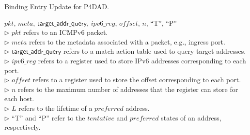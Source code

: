 \documentclass[journal]{IEEEtran}
\begin{document}
        \begin{algorithm}[!t]
        \caption{Binding Entry Update for P4DAD.}
        \label{alg:binding-entry-update}
            \begin{algorithmic}[1]
            \Require $pkt$, $meta$, $\mathsf{target\_addr\_query}$, $ipv6\_reg$, $of\!fset$, $n$, ``T'', ``P''\\
            $\triangleright$ $pkt$ refers to an ICMPv6 packet.\\
            $\triangleright$ $meta$ refers to the metadata associated with a packet, e.g., ingress port.\\
            $\triangleright$ $\mathsf{target\_addr\_query}$ refers to a match-action table used to query target addresses.\\
            $\triangleright$ $ipv6\_reg$ refers to a register used to store IPv6 addresses corresponding to each port.\\
            $\triangleright$ $of\!fset$ refers to a register used to store the offset corresponding to each port.\\
            $\triangleright$ $n$ refers to the maximum number of addresses that the register can store for each host.\\
            $\triangleright$ $L$ refers to the lifetime of a $preferred$ address.\\
            $\triangleright$ ``T'' and ``P'' refer to the $tentative$ and $preferred$ states of an address, respectively.


\end{algorithmic}
\end{algorithm}
\end{document}
